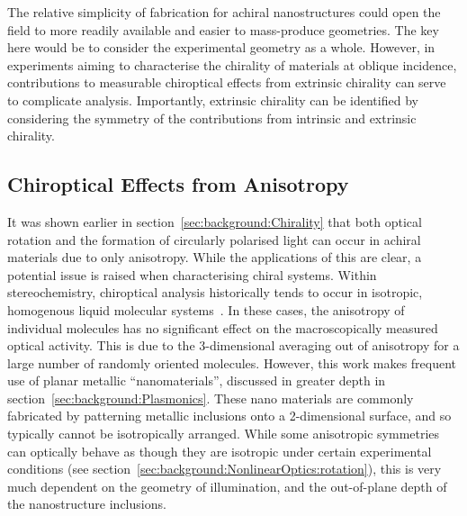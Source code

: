 The relative simplicity of fabrication for achiral nanostructures could open the field to more readily available and easier to mass-produce geometries. The key here would be to consider the experimental geometry as a whole. However, in experiments aiming to characterise the chirality of materials at oblique incidence, contributions to measurable chiroptical effects from extrinsic chirality can serve to complicate analysis. Importantly, extrinsic chirality can be identified by considering the symmetry of the contributions from intrinsic and extrinsic chirality.


\subsection{Chiroptical Effects from Anisotropy}\label{sec:background:Chirality:anisotropy}

It was shown earlier in section~\ref{sec:background:Chirality} that both optical rotation and the formation of circularly polarised light can occur in achiral materials due to only anisotropy. 
While the applications of this are clear, a potential issue is raised when characterising chiral systems. 
Within stereochemistry, chiroptical analysis historically tends to occur in isotropic, homogenous liquid molecular systems~\cite{Berova2012a}. In these cases, the anisotropy of individual molecules has no significant effect on the macroscopically measured optical activity. This is due to the 3-dimensional averaging out of anisotropy for a large number of randomly oriented molecules. 
However, this work makes frequent use of planar metallic ``nanomaterials'', discussed in greater depth in section~\ref{sec:background:Plasmonics}. These nano materials are commonly fabricated by patterning metallic inclusions onto a 2-dimensional surface, and so typically cannot be isotropically arranged. While some anisotropic symmetries can optically behave as though they are isotropic under certain experimental conditions (see section~\ref{sec:background:NonlinearOptics:rotation}), this is very much dependent on the geometry of illumination, and the out-of-plane depth of the nanostructure inclusions.

